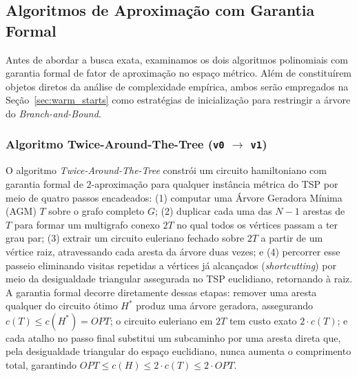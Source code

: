 \subsection{Algoritmos de Aproximação com Garantia Formal}
\label{sec:aproximados}

Antes de abordar a busca exata, examinamos os dois algoritmos polinomiais com garantia formal
de fator de aproximação no espaço métrico. Além de constituírem objetos diretos da análise de
complexidade empírica, ambos serão empregados na Seção~\ref{sec:warm_starts} como estratégias
de inicialização para restringir a árvore do \textit{Branch-and-Bound}.

\subsubsection{Algoritmo Twice-Around-The-Tree (\texttt{v0} \texorpdfstring{$\rightarrow$}{->} \texttt{v1})}
\label{sec:twice_around}

O algoritmo \textit{Twice-Around-The-Tree} \cite{rosenkrantz1977analysis}
constrói um circuito hamiltoniano com garantia formal de $2$-aproximação para qualquer
instância métrica do TSP por meio de quatro passos encadeados: (1) computar uma Árvore Geradora
Mínima (AGM) $T$ sobre o grafo completo $G$; (2) duplicar cada uma das $N - 1$ arestas de $T$
para formar um multigrafo conexo $2T$ no qual todos os vértices passam a ter grau par; (3)
extrair um circuito euleriano fechado sobre $2T$ a partir de um vértice raiz, atravessando cada
aresta da árvore duas vezes; e (4) percorrer esse passeio eliminando visitas repetidas a
vértices já alcançados (\textit{shortcutting}) por meio da desigualdade triangular assegurada no TSP euclidiano, retornando à raiz. A garantia formal
decorre diretamente dessas etapas: remover uma aresta qualquer do circuito ótimo $H^*$ produz
uma árvore geradora, assegurando $c(T) \le c(H^*) = OPT$; o circuito euleriano em $2T$ tem
custo exato $2 \cdot c(T)$; e cada atalho no passo final substitui um subcaminho por uma aresta
direta que, pela desigualdade triangular do espaço euclidiano, nunca aumenta o comprimento
total, garantindo $OPT \le c(H) \le 2 \cdot c(T) \le 2 \cdot OPT$.

